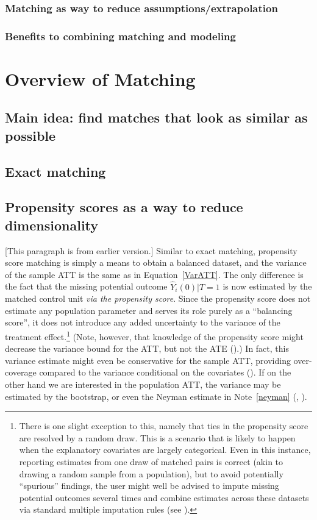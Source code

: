 \documentclass[11pt,titlepage]{article}
\begin{document}
\subsubsection{Matching as way to reduce assumptions/extrapolation}
\subsubsection{Benefits to combining matching and modeling}
                                                                                                                                                             
\section{Overview of Matching}
\subsection{Main idea: find matches that look as similar as possible}
\subsection{Exact matching}
\subsection{Propensity scores as a way to reduce dimensionality}
[This paragraph is from earlier version.]  Similar to exact matching, propensity score matching is simply a means
to obtain a balanced dataset, and the
variance of the sample ATT is the same as in Equation~\ref{VarATT}.
The only difference is the fact that the missing potential outcome
$\hat{Y}_i(0) | T=1$ is now estimated by the matched control unit \emph{via the propensity
score}.  Since the propensity score does not estimate any population
parameter and serves its role purely as a ``balancing score'', it does
not introduce any added uncertainty to the variance of the treatment
effect.\footnote{There is one slight exception to this, namely that
  ties in the propensity score are resolved by a random draw.  This is
  a scenario that is likely to happen when the explanatory covariates
  are largely categorical.  Even in this instance, reporting estimates
  from one draw of matched pairs is correct (akin to drawing a random
  sample from a population), but to avoid potentially ``spurious'' findings, the 
  user might well be advised to impute
  missing potential outcomes several times and combine estimates
  across these datasets via standard multiple imputation rules
  (see \citealt{rubin87}).}  (Note, however, that knowledge of the propensity score might decrease the
variance bound for the ATT, but not the ATE
(\citealt{frolich02,hahn98,HirImbRid02}).)  In fact, this variance
estimate might even be conservative for the sample ATT, providing
over-coverage compared to the variance conditional on the
covariates (\citealt{AbaImbND}).
If on the other hand we are interested in the population ATT, the
variance may be estimated by the bootstrap, or even the Neyman
estimate in Note~\ref{neyman} (\citealt{ImbensNDb}, \citealt[Chapter
6]{ImbRubND}).
\end{document}
